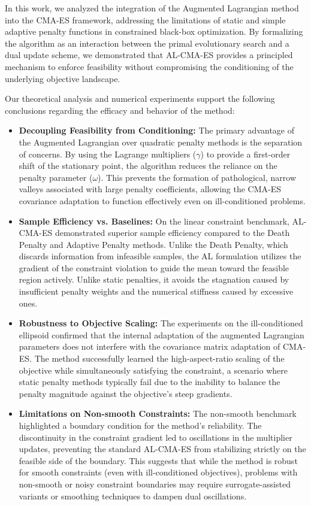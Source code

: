 \documentclass[11pt,a4paper]{article}
\numberwithin{equation}{section}
\numberwithin{figure}{section}
\numberwithin{table}{section}
\theoremstyle{definition}
\begin{document}
In this work, we analyzed the integration of the Augmented Lagrangian method into the CMA-ES framework, addressing the limitations of static and simple adaptive penalty functions in constrained black-box optimization. By formalizing the algorithm as an interaction between the primal evolutionary search and a dual update scheme, we demonstrated that AL-CMA-ES provides a principled mechanism to enforce feasibility without compromising the conditioning of the underlying objective landscape.

Our theoretical analysis and numerical experiments support the following conclusions regarding the efficacy and behavior of the method:

\begin{itemize}
    \item \textbf{Decoupling Feasibility from Conditioning:} 
    The primary advantage of the Augmented Lagrangian over quadratic penalty methods is the separation of concerns. By using the Lagrange multipliers ($\gamma$) to provide a first-order shift of the stationary point, the algorithm reduces the reliance on the penalty parameter ($\omega$). This prevents the formation of pathological, narrow valleys associated with large penalty coefficients, allowing the CMA-ES covariance adaptation to function effectively even on ill-conditioned problems.

    \item \textbf{Sample Efficiency vs. Baselines:} 
    On the linear constraint benchmark, AL-CMA-ES demonstrated superior sample efficiency compared to the Death Penalty and Adaptive Penalty methods. Unlike the Death Penalty, which discards information from infeasible samples, the AL formulation utilizes the gradient of the constraint violation to guide the mean toward the feasible region actively. Unlike static penalties, it avoids the stagnation caused by insufficient penalty weights and the numerical stiffness caused by excessive ones.

    \item \textbf{Robustness to Objective Scaling:} 
    The experiments on the ill-conditioned ellipsoid confirmed that the internal adaptation of the augmented Lagrangian parameters does not interfere with the covariance matrix adaptation of CMA-ES. The method successfully learned the high-aspect-ratio scaling of the objective while simultaneously satisfying the constraint, a scenario where static penalty methods typically fail due to the inability to balance the penalty magnitude against the objective's steep gradients.

    \item \textbf{Limitations on Non-smooth Constraints:} 
    The non-smooth benchmark highlighted a boundary condition for the method's reliability. The discontinuity in the constraint gradient led to oscillations in the multiplier updates, preventing the standard AL-CMA-ES from stabilizing strictly on the feasible side of the boundary. This suggests that while the method is robust for smooth constraints (even with ill-conditioned objectives), problems with non-smooth or noisy constraint boundaries may require surrogate-assisted variants or smoothing techniques to dampen dual oscillations.
\end{itemize}
\end{document}
